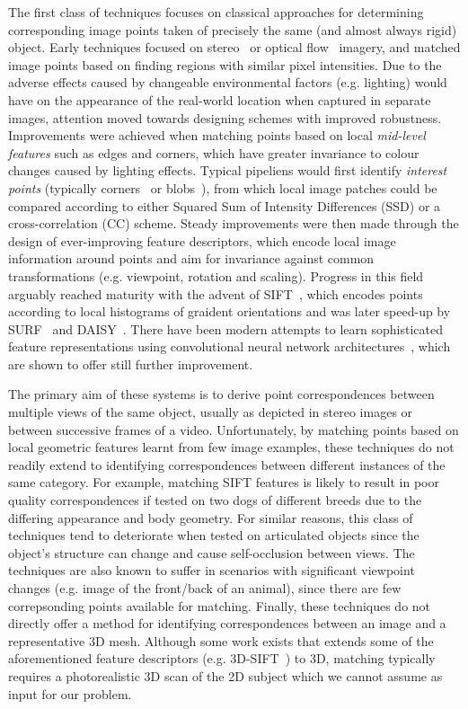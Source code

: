 The first class of techniques focuses on classical approaches for determining corresponding image points taken of precisely the same (and almost always rigid) object. Early techniques focused on stereo~\cite{corres-stereo} or optical flow~\cite{corres-optflow} imagery, and matched image points based on finding regions with similar pixel intensities. Due to the adverse effects caused by changeable environmental factors (e.g. lighting) would have on the appearance of the real-world location when captured in separate images, attention moved towards designing schemes with improved robustness. Improvements were achieved when matching points based on local \emph{mid-level features} such as edges and corners, which have greater invariance to colour changes caused by lighting effects. Typical pipeliens would first identify \emph{interest points} (typically corners~\cite{corner-moravec,corner-harris,corner-susan} or blobs~\cite{sift}), from which local image patches could be compared according to either Squared Sum of Intensity Differences (SSD) or a cross-correlation (CC) scheme. Steady improvements were then made through the design of ever-improving feature descriptors, which encode local image information around points and aim for invariance against common transformations (e.g. viewpoint, rotation and scaling). Progress in this field arguably reached maturity with the advent of SIFT~\cite{sift}, which encodes points according to local histograms of graident orientations and was later speed-up by SURF~\cite{surf} and DAISY~\cite{daisy}. There have been modern attempts to learn sophisticated feature representations using convolutional neural network architectures~\cite{lift, matchnet}, which are shown to offer still further improvement.

The primary aim of these systems is to derive point correspondences between multiple views of the same object, usually as depicted in stereo images or between successive frames of a video. Unfortunately, by matching points based on local geometric features learnt from few image examples, these techniques do not readily extend to identifying correspondences between different instances of the same category. For example, matching SIFT features is likely to result in poor quality correspondences if tested on two dogs of different breeds due to the differing appearance and body geometry. For similar reasons, this class of techniques tend to deteriorate when tested on articulated objects since the object's structure can change and cause self-occlusion between views. The techniques are also known to suffer in scenarios with significant viewpoint changes (e.g. image of the front/back of an animal), since there are few correpsonding points available for matching. Finally, these techniques do not directly offer a method for identifying correspondences between an image and a representative 3D mesh. Although some work exists that extends some of the aforementioned feature descriptors (e.g. 3D-SIFT~\cite{sift-3d}) to 3D, matching typically requires a photorealistic 3D scan of the 2D subject which we cannot assume as input for our problem.

